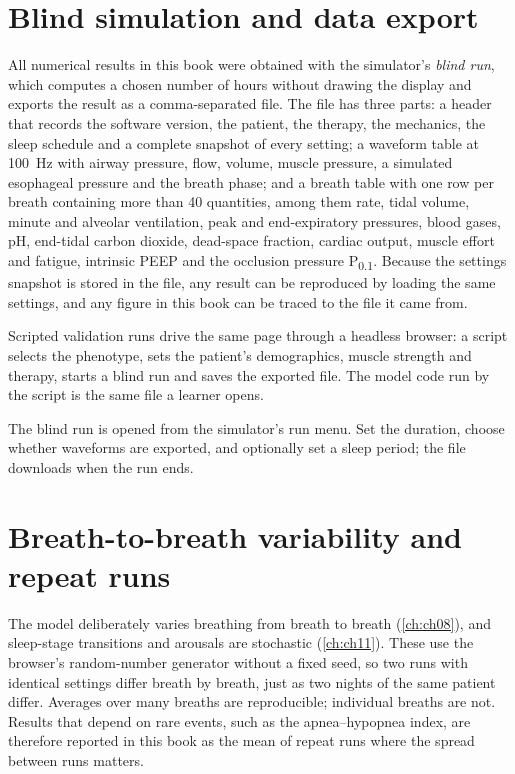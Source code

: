 \section{Blind simulation and data export}
\label{sec:impl-blind}
All numerical results in this book were obtained with the simulator's \emph{blind run}, which computes a chosen number of hours without drawing the display and exports the result as a comma-separated file. The file has three parts: a header that records the software version, the patient, the therapy, the mechanics, the sleep schedule and a complete snapshot of every setting; a waveform table at \SI{100}{\hertz} with airway pressure, flow, volume, muscle pressure, a simulated esophageal pressure and the breath phase; and a breath table with one row per breath containing more than 40 quantities, among them rate, tidal volume, minute and alveolar ventilation, peak and end-expiratory pressures, blood gases, pH, end-tidal carbon dioxide, dead-space fraction, cardiac output, muscle effort and fatigue, intrinsic PEEP and the occlusion pressure P\textsubscript{0.1}. Because the settings snapshot is stored in the file, any result can be reproduced by loading the same settings, and any figure in this book can be traced to the file it came from.

Scripted validation runs drive the same page through a headless browser: a script selects the phenotype, sets the patient's demographics, muscle strength and therapy, starts a blind run and saves the exported file. The model code run by the script is the same file a learner opens.

\begin{simnote}
The blind run is opened from the simulator's run menu. Set the duration, choose whether waveforms are exported, and optionally set a sleep period; the file downloads when the run ends.
\end{simnote}

\section{Breath-to-breath variability and repeat runs}
\label{sec:impl-random}
The model deliberately varies breathing from breath to breath (\cref{ch:ch08}), and sleep-stage transitions and arousals are stochastic (\cref{ch:ch11}). These use the browser's random-number generator without a fixed seed, so two runs with identical settings differ breath by breath, just as two nights of the same patient differ. Averages over many breaths are reproducible; individual breaths are not. Results that depend on rare events, such as the apnea--hypopnea index, are therefore reported in this book as the mean of repeat runs where the spread between runs matters.

